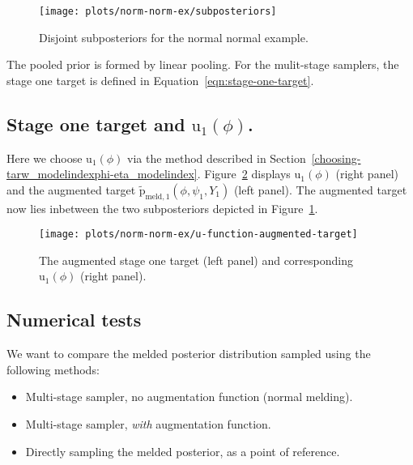 \documentclass[10pt,a4paper,]{article}
\providecommand{\tightlist}{%
  \setlength{\itemsep}{0pt}\setlength{\parskip}{0pt}}
\newcommand{\pd}{\text{p}}
\begin{document}
\begin{figure}

{\centering \texttt{[image: plots/norm-norm-ex/subposteriors]} 

}

\caption{Disjoint subposteriors for the normal normal example.}\label{fig:subposteriors}
\end{figure}

The pooled prior is formed by linear pooling. For the mulit-stage
samplers, the stage one target is defined in
Equation~\eqref{eqn:stage-one-target}.

\subsection{\texorpdfstring{Stage one target and
\(\text{u}_{1}(\phi)\).}{Stage one target and \textbackslash{}text\{u\}\_\{1\}(\textbackslash{}phi).}}\label{stage-one-target-and-textu_1phi.}

Here we choose \(\text{u}_{1}(\phi)\) via the method described in
Section~\ref{choosing-tarw_modelindexphi-eta_modelindex}.
Figure~\ref{fig:u_func_augmented_target} displays \(\text{u}_{1}(\phi)\)
(right panel) and the augmented target
\(\tilde{\pd}_{\text{meld}, 1}(\phi, \psi_{1}, Y_{1})\) (left panel).
The augmented target now lies inbetween the two subposteriors depicted
in Figure~\ref{fig:subposteriors}.

\begin{figure}

{\centering \texttt{[image: plots/norm-norm-ex/u-function-augmented-target]} 

}

\caption{The augmented stage one target (left panel) and corresponding $\text{u}_{1}(\phi)$ (right panel).}\label{fig:u_func_augmented_target}
\end{figure}

\subsection{Numerical tests}\label{numerical-tests}

We want to compare the melded posterior distribution sampled using the
following methods:

\begin{itemize}
\tightlist
\item
  Multi-stage sampler, no augmentation function (normal melding).
\item
  Multi-stage sampler, \emph{with} augmentation function.
\item
  Directly sampling the melded posterior, as a point of reference.
\end{itemize}
\end{document}

